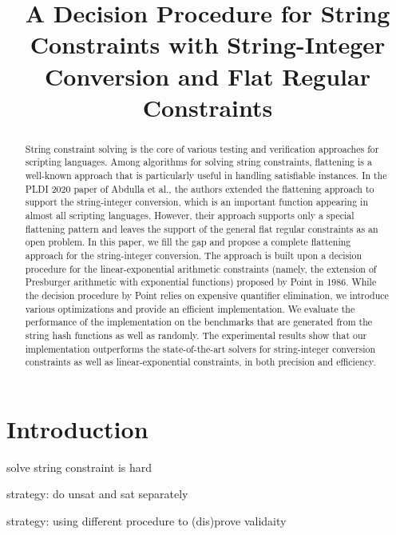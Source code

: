 \documentclass[runningheads]{llncs}
\title{A Decision Procedure for String Constraints with String-Integer Conversion and Flat Regular Constraints}
\author{ }
\institute{ }
\begin{document}
\maketitle{}

\begin{abstract}
    String constraint solving is the core of various testing and verification approaches for scripting languages. 
    Among algorithms for solving string constraints, flattening is a well-known approach that is particularly useful in handling satisfiable instances.
    In the PLDI 2020 paper of Abdulla et al., the authors extended the flattening approach to support the string-integer conversion, which is an important function appearing in almost all scripting languages.
    However, their approach supports only a special flattening pattern and leaves the support of the general flat regular constraints as an open problem.
    In this paper, we fill the gap and propose a complete flattening approach for the string-integer conversion. The approach is built upon a decision procedure for the linear-exponential arithmetic constraints (namely, the extension of Presburger arithmetic with exponential functions) proposed by Point in 1986. While the decision procedure by Point relies on expensive quantifier elimination, we introduce various optimizations and provide an efficient implementation.
    We evaluate the performance of the implementation on the benchmarks that are generated from the string hash functions as well as randomly.
    The experimental results show that our implementation outperforms the state-of-the-art solvers for string-integer conversion constraints as well as linear-exponential constraints, in both precision and efficiency.

\end{abstract}

\section{Introduction}

solve string constraint is hard

strategy: do unsat and sat separately

strategy: using different procedure to (dis)prove validaity
\end{document}
